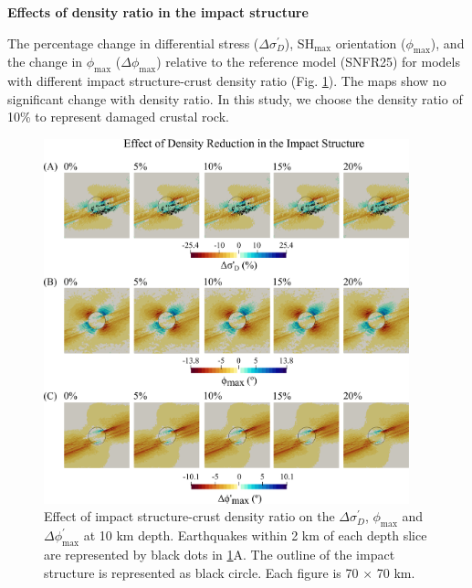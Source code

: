 \documentclass[draft,jgrga]{agutexSI2019}
\begin{document}
\begin{article}
\vspace{10mm} %

\noindent\textbf{Effects of density ratio in the impact structure}

 The percentage change in differential stress ($\Delta\sigma_{D}^{\prime}$), SH$_{\max}$ orientation ($\phi_{\max}$), and the change in $\phi_{\max}$ ($\Delta\phi_{\max}$) relative to the reference model (SNFR25) for models with different impact structure-crust density ratio (Fig. \ref{S3}).  The maps show no significant change with density ratio. In this study, we choose the density ratio of 10\% to represent damaged crustal rock. 
\vspace{10mm} %

\begin{figure}[ht]
\includegraphics[width=25pc]{Figures/effect_of_density.png}
\caption{ Effect of impact structure-crust density ratio on the $\Delta\sigma_{D}^{\prime}$, $\phi_{\max}$ and $\Delta \phi_{\max}^{\prime}$ at 10 km depth. Earthquakes within 2 km of each depth slice are represented by black dots in \ref{S3}A. The outline of the impact structure is represented as black circle. Each figure is 70 $\times$ 70 km.}
\label{S3}
\end{figure}


\end{article}
\end{document}
